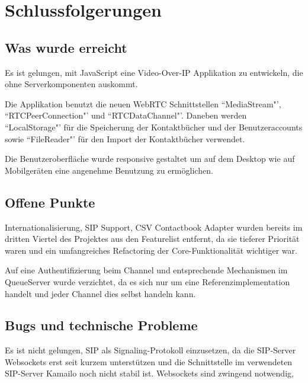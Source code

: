 \chapter{Schlussfolgerungen}
	\section{Was wurde erreicht}
	Es ist gelungen, mit JavaScript eine Video-Over-IP Applikation zu entwickeln, die ohne Serverkomponenten auskommt.
	
	Die Applikation benutzt die neuen WebRTC Schnittstellen ``MediaStream"', ``RTCPeerConnection"' und ``RTCDataChannel"'. Daneben werden ``LocalStorage"' für die Speicherung der Kontaktbücher und der Benutzeraccounts sowie ``FileReader"' für den Import der Kontaktbücher verwendet.
	
	Die Benutzeroberfläche wurde responsive gestaltet um auf dem Desktop wie auf Mobilgeräten eine angenehme Benutzung zu ermöglichen.
	
	
	\section{Offene Punkte}
	Internationalisierung, SIP Support, CSV Contactbook Adapter wurden bereits im dritten Viertel des Projektes aus den Featurelist entfernt, da sie tieferer Priorität waren und ein umfangreiches Refactoring der Core-Funktionalität wichtiger war.
	
	Auf eine Authentifizierung beim Channel und entsprechende Mechanismen im QueueServer wurde verzichtet, da es sich nur um eine Referenzimplementation handelt und jeder Channel dies selbst handeln kann.
	
	
	\section{Bugs und technische Probleme}
	Es ist nicht gelungen, SIP als Signaling-Protokoll einzusetzen, da die SIP-Server Websockets erst seit kurzem unterstützen und die Schnittstelle im verwendeten SIP-Server Kamailo noch nicht stabil ist. Websockets sind zwingend notwendig, 